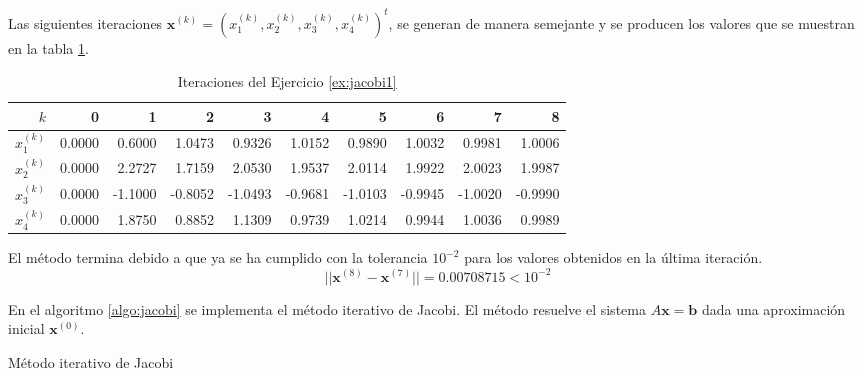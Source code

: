 \begin{exerciseT}
Las siguientes iteraciones $\textbf{x}^{(k)}=(x_1^{(k)}, x_2^{(k)}, x_3^{(k)}, x_4^{(k)})^t$, se generan de manera semejante y se producen los valores 
que se muestran en la tabla \ref{table:jacobi1}.

\begin{table}[H]
	\centering
	\begin{tabular}{r|rrrrrrrrr}
		\toprule
		$k$ & 0 & 1 & 2 & 3 & 4 & 5 & 6 & 7 & 8\\\midrule
		$x_1^{(k)}$ & 0.0000 & 0.6000 & 1.0473 & 0.9326 & 1.0152 & 0.9890 & 1.0032 & 0.9981 & 1.0006 \\
		$x_2^{(k)}$ & 0.0000 & 2.2727 & 1.7159 & 2.0530 & 1.9537 & 2.0114 & 1.9922 & 2.0023 & 1.9987 \\
		$x_3^{(k)}$ & 0.0000 &-1.1000 &-0.8052 &-1.0493 &-0.9681 &-1.0103 &-0.9945 &-1.0020 &-0.9990 \\
		$x_4^{(k)}$ & 0.0000 & 1.8750 & 0.8852 & 1.1309 & 0.9739 & 1.0214 & 0.9944 & 1.0036 & 0.9989 \\
		\bottomrule
      \end{tabular}
	\caption{Iteraciones del Ejercicio \ref{ex:jacobi1}}
	\label{table:jacobi1}
\end{table}  
\label{ex:jacobi1}
El método termina debido a que ya se ha cumplido con la tolerancia $10^{-2}$ para los valores obtenidos en la última iteración.
$$||\textbf{x}^{(8)}-\textbf{x}^{(7)}|| = 0.00708715 < 10^{-2}$$
\end{exerciseT}

En el algoritmo \ref{algo:jacobi} se implementa el método iterativo de Jacobi. El método resuelve el sistema $A\textbf{x}=\textbf{b}$ dada 
una aproximación inicial $\textbf{x}^{(0)}$.

\begin{algorithm}[ht]
\caption{Método iterativo de Jacobi}
\label{algo:jacobi}
\end{algorithm}

